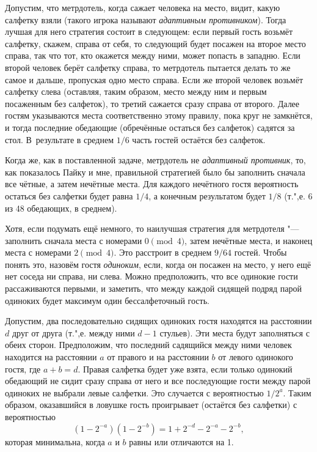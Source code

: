 \documentclass[twoside]{book}
\begin{document}
\bigskip

Допустим, что метрдотель, когда сажает человека на место, видит, какую салфетку взяли (такого игрока называют \emph{адаптивным противником}). %
Тогда лучшая для него стратегия состоит в следующем:
если первый гость возьмёт салфетку, скажем, справа от себя, то следующий будет посажен на второе место справа, так что тот, кто окажется между ними, может попасть в западню.
Если второй человек берёт салфетку справа, то метрдотель пытается делать то же самое и дальше, пропуская одно место справа.
Если же второй человек возьмёт салфетку слева (оставляя, таким образом, место между ним и первым посаженным без салфеток), то третий сажается сразу справа от второго.
Далее гостям указываются места соответственно этому правилу, пока круг не замкнётся, и тогда последние обедающие (обречённые остаться без салфеток) садятся за стол.
В~результате в среднем $1/6$ часть гостей остаётся без салфеток.

Когда же, как в поставленной задаче, метрдотель не \emph{адаптивный противник}, то, как показалось Пайку и мне, правильной стратегией было бы заполнить сначала все чётные, а затем нечётные места.
Для каждого нечётного гостя вероятность остаться без салфетки будет равна $1/4$, %
а конечным результатом будет $1/8$ (т.",е. 6 из 48 обедающих, в среднем).

Хотя, если подумать ещё немного, то наилучшая стратегия для метрдотеля "--- заполнить сначала места с номерами $0\pmod4$, затем нечётные места, и наконец места с номерами $2\pmod4$.
Это расстроит в среднем $9/64$ гостей.
Чтобы понять это, назовём гостя \emph{одиноким}, если, когда он посажен на место, у него ещё нет соседа ни справа, ни слева.
Можно предположить, что все одинокие гости рассаживаются первыми, и заметить, что между каждой сидящей подряд парой одиноких будет максимум один бессалфеточный гость.

Допустим, два последовательно сидящих одиноких гостя находятся на расстоянии $d$ друг от друга (т.",е. между ними $d-1$ стульев).
Эти места будут заполняться с обеих сторон.
Предположим, что последний садящийся между ними человек находится на расстоянии $a$ от правого и на расстоянии $b$ от левого одинокого гостя, где $a+b=d$.
Правая салфетка будет уже взята, если только одинокий обедающий не сидит сразу справа от него и все последующие гости между парой одиноких не выбрали левые салфетки.
Это случается с вероятностью $1/2^a$.
Таким образом, оказавшийся в ловушке 
гость проигрывает (остаётся без салфетки) с вероятностью
\[(1-2^{-a})(1-2^{-b})=1 + 2^{-d}-2^{-a}-2^{-b},\]
которая минимальна, когда $a$ и $b$ равны или отличаются на 1.
\end{document}
